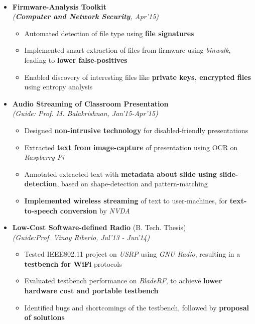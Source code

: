 \\[\lsep]

\begin{itemize}
	\itemsep-0.25em
	\item \textbf{Firmware-Analysis Toolkit} \\
	\emph{(\textbf{Computer and Network Security}, Apr'15)} \\[-0.7cm]

		\begin{itemize}\itemsep \isep
		\item Automated detection of file type using \textbf{file signatures}
		\item Implemented smart extraction of files from firmware using \textit{binwalk}, leading to \textbf{lower false-positives}
		\item Enabled discovery of interesting files like \textbf{private keys, encrypted files} using entropy analysis
		\end{itemize}

	\item \textbf{Audio Streaming of Classroom Presentation} \\
	\emph{(Guide: Prof. M. Balakrishnan, Jan'15-Apr'15)} \\[-0.7cm]

		\begin{itemize}\itemsep \isep
		\item Designed \textbf{non-intrusive technology} for disabled-friendly presentations
		\item Extracted \textbf{text from image-capture} of presentation using OCR on \textit{Raspberry Pi}
		\item Annotated extracted text with \textbf{metadata about slide using slide-detection}, based on shape-detection and pattern-matching
		\item \textbf{Implemented wireless streaming} of text to user-machines, for \textbf{text-to-speech conversion} by \textit{NVDA}
		\end{itemize}

	\item \textbf{Low-Cost Software-defined Radio} (B. Tech. Thesis) \\
	\emph{(Guide:Prof. Vinay Riberio, Jul'13 - Jun'14)} \\[-0.7cm]

		\begin{itemize}\itemsep \isep
		\item Tested IEEE802.11 project on \textit{USRP} using \textit{GNU Radio}, resulting in a \textbf{testbench for WiFi} protocols
		\item Evaluated testbench performance on \textit{BladeRF}, to achieve \textbf{lower hardware cost and portable testbench}
		\item Identified bugs and shortcomings of the testbench, followed by \textbf{proposal of solutions}
		\end{itemize}


\end{itemize}

